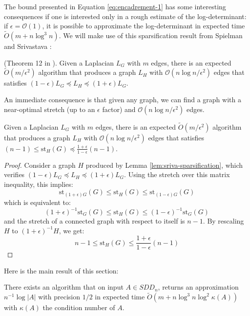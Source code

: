 The bound presented in Equation \ref{eq:encadrement-1} has some interesting
consequences if one is interested only in a rough estimate of the
log-determinant: if $\epsilon=\mathcal{O}\left(1\right)$, it is possible
to approximate the log-determinant in expected time $\tilde{O}\left(m+n\log^{3}n\right)$.
We will make use of this sparsification result from Spielman and Srivastava
\cite{Spielman2009}:
\begin{lemma}
\label{lem:sriva-sparsification}(Theorem 12 in \cite{Spielman2009}).
Given a Laplacian $L_{G}$ with $m$ edges, there is an expected $\tilde{O}\left(m/\epsilon^{2}\right)$
algorithm that produces a graph $L_{H}$ with $\mathcal{O}\left(n\log n/\epsilon^{2}\right)$
edges that satisfies $\left(1-\epsilon\right)L_{G}\preceq L_{H}\preceq\left(1+\epsilon\right)L_{G}$.
\end{lemma}
An immediate consequence is that given any graph, we can find a graph
with a near-optimal stretch (up to an $\epsilon$ factor) and $\mathcal{O}\left(n\log n/\epsilon^{2}\right)$
edges.
\begin{lemma}
\label{lem:low-stretch-bounding}Given a Laplacian $L_{G}$ with $m$
edges, there is an expected $\tilde{O}\left(m/\epsilon^{2}\right)$
algorithm that produces a graph $L_{H}$ with $\mathcal{O}\left(n\log n/\epsilon^{2}\right)$
edges that satisfies $\left(n-1\right)\leq\text{st}_{H}\left(G\right)\preceq\frac{1+\epsilon}{1-\epsilon}\left(n-1\right)$.\end{lemma}
\begin{proof}
Consider a graph $H$ produced by Lemma \ref{lem:sriva-sparsification},
which verifies $\left(1-\epsilon\right)L_{G}\preceq L_{H}\preceq\left(1+\epsilon\right)L_{G}$.
Using the stretch over this matrix inequality, this implies: 
\[
\text{st}_{\left(1+\epsilon\right)G}\left(G\right)\leq\text{st}_{H}\left(G\right)\leq\text{st}_{\left(1-\epsilon\right)G}\left(G\right)
\]
which is equivalent to: 
\[
\left(1+\epsilon\right)^{-1}\text{st}_{G}\left(G\right)\leq\text{st}_{H}\left(G\right)\leq\left(1-\epsilon\right)^{-1}\text{st}_{G}\left(G\right)
\]
and the stretch of a connected graph with respect to itself is $n-1$.
By rescaling $H$ to $\left(1+\epsilon\right)^{-1}H$, we get: 
\[
n-1\leq\text{st}_{H}\left(G\right)\leq\frac{1+\epsilon}{1-\epsilon}\left(n-1\right)
\]

\end{proof}
Here is the main result of this section:
\begin{proposition}
There exists an algorithm that on input $A\in SDD_{n}$, returns an
approximation $n^{-1}\log\left|A\right|$ with precision $1/2$ in
expected time $\tilde{O}\left(m+n\log^{3}n\log^{2}\kappa(A)\right)$
with $\kappa(A)$ the condition number of $A$.\end{proposition}
